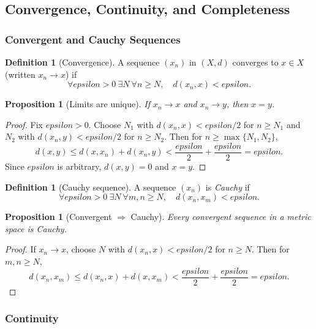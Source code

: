 \documentclass[12pt]{article}
\numberwithin{equation}{section}
\def\eps{epsilon}
\newcommand{\eps}{\varepsilon}               %
\theoremstyle{plain}
\newtheorem{proposition}[theorem]{Proposition}
\theoremstyle{definition}
\newtheorem{definition}[theorem]{Definition}
\theoremstyle{remark}
\begin{document}
\subsection{Convergence, Continuity, and Completeness}

\subsubsection{Convergent and Cauchy Sequences}

\begin{definition}[Convergence]\label{ms:def:convergence}
A sequence $(x_n)$ in $(X,d)$ converges to $x\in X$ (written $x_n\to x$) if
\[
\forall \eps>0\ \exists N\ \forall n\ge N,\quad d(x_n,x)<\eps.
\]
\end{definition}

\begin{proposition}[Limits are unique]\label{ms:prop:unique-limit}
If $x_n\to x$ and $x_n\to y$, then $x=y$.
\end{proposition}

\begin{proof}
Fix $\eps>0$. Choose $N_1$ with $d(x_n,x)<\eps/2$ for $n\ge N_1$ and $N_2$ with $d(x_n,y)<\eps/2$ for $n\ge N_2$.
Then for $n\ge \max\{N_1,N_2\}$,
\[
d(x,y)\le d(x,x_n)+d(x_n,y)<\frac{\eps}{2}+\frac{\eps}{2}=\eps.
\]
Since $\eps$ is arbitrary, $d(x,y)=0$ and $x=y$.
\end{proof}

\begin{definition}[Cauchy sequence]\label{ms:def:cauchy}
A sequence $(x_n)$ is \emph{Cauchy} if
\[
\forall \eps>0\ \exists N\ \forall m,n\ge N,\quad d(x_n,x_m)<\eps.
\]
\end{definition}

\begin{proposition}[Convergent $\Rightarrow$ Cauchy]\label{ms:prop:conv-implies-cauchy}
Every convergent sequence in a metric space is Cauchy.
\end{proposition}

\begin{proof}
If $x_n\to x$, choose $N$ with $d(x_n,x)<\eps/2$ for $n\ge N$. Then for $m,n\ge N$,
\[
d(x_n,x_m)\le d(x_n,x)+d(x,x_m)<\frac{\eps}{2}+\frac{\eps}{2}=\eps.
\]
\end{proof}

\subsubsection{Continuity}
\end{document}
